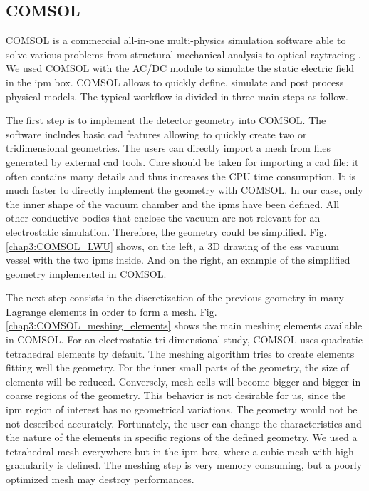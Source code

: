 \begin{refsection}

  \subsection{COMSOL}
  COMSOL is a commercial all-in-one multi-physics simulation software able to solve various problems from structural mechanical analysis to optical raytracing \cite{comsol2018}. We used COMSOL with the AC/DC module \cite{comsolacdc2018} to simulate the static electric field in the \acrshort{ipm} box. COMSOL allows to quickly define, simulate and post process physical models. The typical workflow is divided in three main steps as follow.
  

  The first step is to implement the detector geometry into COMSOL. The software includes basic \acrshort{cad} features allowing to quickly create two or tridimensional geometries. The users can directly import a mesh from files generated by external \acrshort{cad} tools. Care should be taken for importing a \acrshort{cad} file: it often contains many details and thus increases the CPU time consumption. It is much faster to directly implement the geometry with COMSOL.  In our case, only the inner shape of the vacuum chamber and the \acrshort{ipm}s have been defined. All other conductive bodies that enclose the vacuum are not relevant for an electrostatic simulation. Therefore, the geometry could be simplified. Fig. \ref{chap3:COMSOL_LWU} shows, on the left, a 3D drawing of the \acrshort{ess} vacuum vessel with the two \acrshort{ipm}s inside. And on the right, an example of the simplified geometry implemented in COMSOL.
  

  The next step consists in the discretization of the previous geometry in many Lagrange elements in order to form a mesh. Fig. \ref{chap3:COMSOL_meshing_elements} shows the main meshing elements available in COMSOL. For an electrostatic tri-dimensional study, COMSOL uses quadratic tetrahedral elements by default. The meshing algorithm tries to create elements fitting well the geometry. For the inner small parts of the geometry, the size of elements will be reduced. Conversely, mesh cells will become bigger and bigger in coarse regions of the geometry. This behavior is not desirable for us, since the \acrshort{ipm} region of interest has no geometrical variations. The geometry would not be not described accurately. Fortunately, the user can change the characteristics and the nature of the elements in specific regions of the defined geometry. We used a tetrahedral mesh everywhere but in the \acrshort{ipm} box, where a cubic mesh with high granularity is defined. The meshing step is very memory consuming, but a poorly optimized mesh may destroy performances.
  


\end{refsection}
